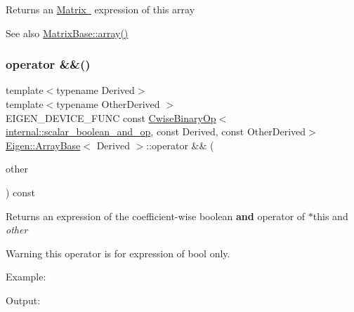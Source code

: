 \begin{DoxyReturn}{Returns}
an \mbox{\hyperlink{class_eigen_1_1_matrix_base}{Matrix }} expression of this array 
\end{DoxyReturn}
\begin{DoxySeeAlso}{See also}
\mbox{\hyperlink{class_eigen_1_1_matrix_base_a76a9dcb91ec82fbd6e74ca2ac2ae0e07}{Matrix\+Base\+::array()}} 
\end{DoxySeeAlso}
\mbox{\label{class_eigen_1_1_array_base_a1b3cb3e9a6f1c1e9168e963cb6e8db62}} 
\subsubsection{\texorpdfstring{operator \&\&()}{operator \&\&()}}
{\footnotesize\ttfamily template$<$typename Derived$>$ \\
template$<$typename Other\+Derived $>$ \\
E\+I\+G\+E\+N\+\_\+\+D\+E\+V\+I\+C\+E\+\_\+\+F\+U\+NC const \mbox{\hyperlink{class_eigen_1_1_cwise_binary_op}{Cwise\+Binary\+Op}}$<$\mbox{\hyperlink{struct_eigen_1_1internal_1_1scalar__boolean__and__op}{internal\+::scalar\+\_\+boolean\+\_\+and\+\_\+op}}, const Derived, const Other\+Derived$>$ \mbox{\hyperlink{class_eigen_1_1_array_base}{Eigen\+::\+Array\+Base}}$<$ Derived $>$\+::operator \&\& (\begin{DoxyParamCaption}\item[{const E\+I\+G\+E\+N\+\_\+\+C\+U\+R\+R\+E\+N\+T\+\_\+\+S\+T\+O\+R\+A\+G\+E\+\_\+\+B\+A\+S\+E\+\_\+\+C\+L\+A\+SS$<$ Other\+Derived $>$ \&}]{other }\end{DoxyParamCaption}) const\hspace{0.3cm}{\ttfamily [inline]}}

\begin{DoxyReturn}{Returns}
an expression of the coefficient-\/wise boolean {\bfseries{and}} operator of {\ttfamily $\ast$this} and {\itshape other} 
\end{DoxyReturn}
\begin{DoxyWarning}{Warning}
this operator is for expression of bool only.
\end{DoxyWarning}
Example\+: 
\begin{DoxyCodeInclude}{0}
\end{DoxyCodeInclude}
 Output\+: 
\begin{DoxyVerbInclude}
\end{DoxyVerbInclude}


